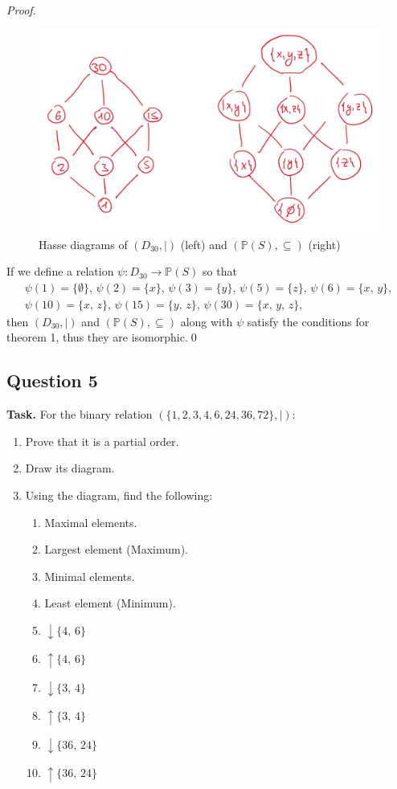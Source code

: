 \documentclass[14pt,a4paper]{extarticle}
\begin{document}
\begin{proof}
	 	\begin{figure}[h]
	 		\centering
	 		\includegraphics[scale=.27]{media/hasse_q4.jpg}
	 		\caption{Hasse diagrams of $(D_{30},|)$ (left) and $(\mathbb{P}(S), \subseteq)$ (right)}
	 		\label{fig:hasse_q4}
	 	\end{figure}
	 	
	 	If we define a relation $\psi:D_{30}\rightarrow\mathbb{P}(S)$ so that
	 	\begin{multline*}
	 		\psi(1)=\{\emptyset\},\,\psi(2)=\{x\},\,\psi(3)=\{y\},\,\psi(5)=\{z\},\,\psi(6)=\{x,\, y\},\\\psi(10)=\{x,\, z\},\,\psi(15)=\{y,\, z\},\,\psi(30)=\{x,\, y,\, z\},
	 	\end{multline*}
	 	then $(D_{30},|)$ and $(\mathbb{P}(S), \subseteq)$ along with $\psi$ satisfy the conditions for theorem 1, thus they are isomorphic.\qed
	\end{proof}
	\newpage
	
	\subsection*{Question 5}
	
	\noindent\textbf{Task.} For the binary relation $(\{1, 2, 3, 4, 6, 24, 36, 72\},|)$:
	\begin{enumerate}
		\item Prove that it is a partial order. 
		\item Draw its diagram. 
		\item Using the diagram, find the following:
		\begin{enumerate}
			\item Maximal elements. 
			\item Largest element (Maximum). 
			\item Minimal elements. 
			\item Least element (Minimum). 
			\item $\downarrow\{4,\, 6\}$
			\item $\uparrow\{4,\, 6\}$ 
			\item $\downarrow\{3,\, 4\}$ 
			\item $\uparrow\{3,\, 4\}$ 
			\item $\downarrow\{36,\, 24\}$
			\item $\uparrow\{36,\, 24\}$
		\end{enumerate}
	\end{enumerate}
	
\end{document}

